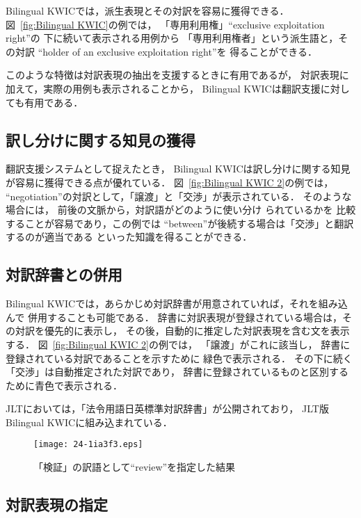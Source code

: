 \documentclass[japanese]{jnlp_1.4}
\begin{document}
Bilingual KWICでは，派生表現とその対訳を容易に獲得できる．
図~\ref{fig:Bilingual KWIC}の例では，
「専用利用権」``exclusive exploitation right''の
下に続いて表示される用例から
「専用利用権者」という派生語と，その対訳
``holder of an exclusive exploitation right''を
得ることができる．

このような特徴は対訳表現の抽出を支援するときに有用であるが，
対訳表現に加えて，実際の用例も表示されることから，
Bilingual KWICは翻訳支援に対しても有用である．


\subsection{訳し分けに関する知見の獲得}

翻訳支援システムとして捉えたとき，
Bilingual KWICは訳し分けに関する知見が容易に獲得できる点が優れている．
図~\ref{fig:Bilingual KWIC 2}の例では，
``negotiation''の対訳として，「譲渡」と「交渉」が表示されている．
そのような場合には，
前後の文脈から，対訳語がどのように使い分け
られているかを
比較することが容易であり，この例では
``between''が後続する場合は「交渉」と翻訳するのが適当である
といった知識を得ることができる．


\subsection{対訳辞書との併用}

Bilingual KWICでは，あらかじめ対訳辞書が用意されていれば，それを組み込んで
併用することも可能である．
辞書に対訳表現が登録されている場合は，その対訳を優先的に表示し，
その後，自動的に推定した対訳表現を含む文を表示する．
図~\ref{fig:Bilingual KWIC 2}の例では，
「譲渡」がこれに該当し，
辞書に登録されている対訳であることを示すために
緑色で表示される．
その下に続く「交渉」は自動推定された対訳であり，
辞書に登録されているものと区別するために青色で表示される．

JLTにおいては，「法令用語日英標準対訳辞書」が公開されており，
JLT版Bilingual KWICに組み込まれている．

\begin{figure}[b]
\vspace{-1\Cvs}
\begin{center}
\texttt{[image: 24-1ia3f3.eps]}
\end{center}
\caption{「検証」の訳語として``review''を指定した結果}
\label{fig:Bilingual KWIC 3}
\end{figure}


\subsection{対訳表現の指定}
\end{document}
